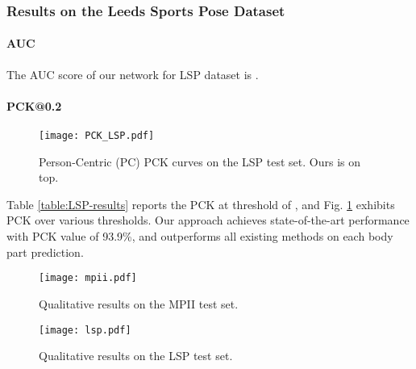 \documentclass[journal ]{IEEEtran}
\begin{document}
\subsubsection{Results on the Leeds Sports Pose Dataset}

\paragraph{AUC}
The AUC score of our network for LSP dataset is .

\paragraph{PCK@0.2}

\begin{figure}[h]
	\begin{center}
		\texttt{[image: PCK\_LSP.pdf]}
	\end{center}
	\caption{Person-Centric (PC) PCK curves on the LSP test set. Ours is on top.}
	\label{fig:pck}
\end{figure}

Table \ref{table:LSP-results} reports the PCK at threshold of , and Fig. \ref{fig:pck} exhibits PCK over various thresholds. Our approach achieves state-of-the-art performance with PCK value of 93.9\%, and outperforms all existing methods on each body part prediction. 

\begin{figure*}[t]
	\centering 
	\begin{center}
		\texttt{[image: mpii.pdf]}
		\caption{Qualitative results on the MPII test set.}
	\end{center}
\label{fig:mpii}
\end{figure*}

\begin{figure*}[h]
	\begin{center}
		\texttt{[image: lsp.pdf]}
	\end{center}
	\caption{Qualitative results on the LSP test set.}
	\label{fig:lsp}
\end{figure*}
\end{document}
